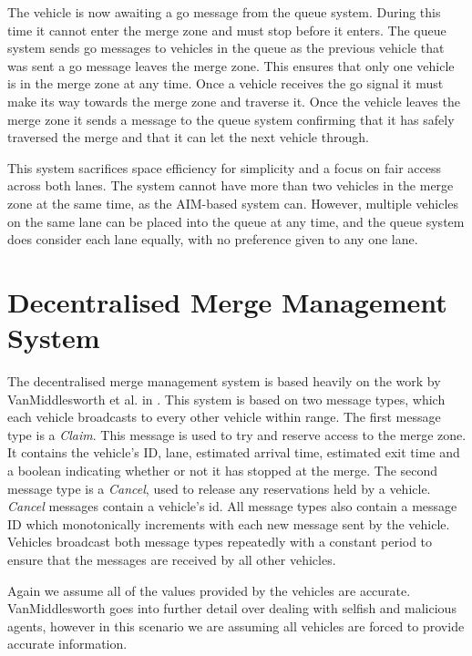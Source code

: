 The vehicle is now awaiting a go message from the queue system. During this time it cannot enter the merge zone and must stop before it enters. The queue system sends go messages to vehicles in the queue as the previous vehicle that was sent a go message leaves the merge zone. This ensures that only one vehicle is in the merge zone at any time. Once a vehicle receives the go signal it must make its way towards the merge zone and traverse it. Once the vehicle leaves the merge zone it sends a message to the queue system confirming that it has safely traversed the merge and that it can let the next vehicle through.

This system sacrifices space efficiency for simplicity and a focus on fair access across both lanes. The system cannot have more than two vehicles in the merge zone at the same time, as the AIM-based system can. However, multiple vehicles on the same lane can be placed into the queue at any time, and the queue system does consider each lane equally, with no preference given to any one lane.

\section{Decentralised Merge Management System}
\label{sec:Decentralised Merge Management System}
The decentralised merge management system is based heavily on the work by VanMiddlesworth et al. in  \citep{VanMiddlesworth2008}. This system is based on two message types, which each vehicle broadcasts to every other vehicle within range. The first message type is a \emph{Claim}. This message is used to try and reserve access to the merge zone. It contains the vehicle's ID, lane, estimated arrival time, estimated exit time and a boolean indicating whether or not it has stopped at the merge. The second message type is a \emph{Cancel}, used to release any reservations held by a vehicle. \emph{Cancel} messages contain a vehicle's id. All message types also contain a message ID which monotonically increments with each new message sent by the vehicle. Vehicles broadcast both message types repeatedly with a constant period to ensure that the messages are received by all other vehicles. 

Again we assume all of the values provided by the vehicles are accurate. VanMiddlesworth \citep{VanMiddlesworth2008} goes into further detail over dealing with selfish and malicious agents, however in this scenario we are assuming all vehicles are forced to provide accurate information.

